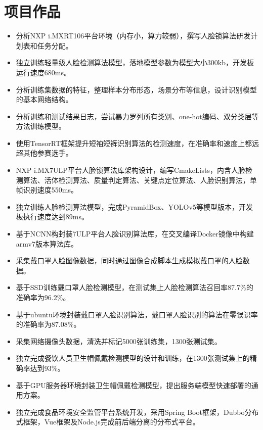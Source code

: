 \documentclass{resume}
\begin{document}
\section{项目作品}
\begin{itemize}
  \item 分析NXP i.MXRT106平台环境（内存小，算力较弱），撰写人脸锁算法研发计划表和任务分配。
  \item 独立训练轻量级人脸检测算法模型，落地模型参数为模型大小300kb，开发板运行速度680ms。
\end{itemize}
\begin{itemize}
  \item 分析训练集数据的特征，整理样本分布形态，场景分布等信息，设计识别模型的基本网络结构。
  \item 分析训练和测试结果日志，尝试暴力罗列所有类别、one-hot编码、双分类层等方法训练模型。
  \item 使用TensorRT框架提升短袖短裤识别算法的检测速度，在准确率和速度上都远超其他参赛选手。
\end{itemize}
\begin{itemize}
  \item NXP i.MX7ULP平台人脸锁算法库架构设计，编写CmakeLists，内含人脸检测算法、活体检测算法、质量判定算法、关键点定位算法、人脸识别算法，单帧识别速度550ms。
  \item 独立训练人脸检测算法模型，完成PyramidBox、YOLOv5等模型版本，开发板执行速度达到89ms。
  \item 基于NCNN构封装7ULP平台人脸识别算法库，在交叉编译Docker镜像中构建armv7版本算法库。
\end{itemize}
\begin{itemize}
  \item 采集戴口罩人脸图像数据，同时通过图像合成脚本生成模拟戴口罩的人脸数据。
  \item 基于SSD训练戴口罩人脸检测模型，在测试集上人脸检测算法召回率87.7$\%$的准确率为96.2$\%$。
  \item 基于ubuntu环境封装戴口罩人脸识别算法，戴口罩人脸识别的算法在零误识率的准确率为87.08$\%$。
\end{itemize}
\begin{itemize}
  \item 采集网络摄像头数据，清洗并标记5000张训练集，1300张测试集。
  \item 独立完成餐饮人员卫生帽佩戴检测模型的设计和训练，在1300张测试集上的精确率达到93$\%$。
  \item 基于GPU服务器环境封装卫生帽佩戴检测模型，提出服务端模型快速部署的通用方案。
  \item 独立完成食品环境安全监管平台系统开发，采用Spring Boot框架，Dubbo分布式框架，Vue框架及Node.js完成前后端分离的分布式平台。
\end{itemize}
\end{document}
